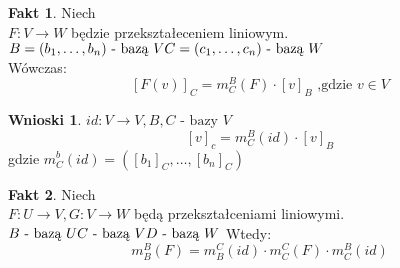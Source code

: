 \documentclass[12pt,a4paper]{article}
\theoremstyle{plain}
\theoremstyle{definition}
\newtheorem{ft}{Fakt}[section]
\theoremstyle{definition}
\theoremstyle{definition}
\theoremstyle{definition}
\theoremstyle{definition}
\theoremstyle{definition}
\theoremstyle{definition}
\theoremstyle{definition}
\theoremstyle{definition}
\newtheorem*{wn}{Wnioski}
\begin{document}
\begin{ft}
    Niech \\ $ F: V \rightarrow W $ będzie przekształeceniem liniowym.\\
    $ B = (b_1, \ldots , b_n) \text{ - bazą } V \\
      C = (c_1, \ldots , c_n) \text{ - bazą } W $ \\
    Wówczas:
    $$ [F(v)]_C = m^B_C(F) \cdot [v]_B \text{ ,gdzie } v \in V$$
\end{ft}

\begin{wn}
    $ id: V \rightarrow V, B, C \text{ - bazy } V$
    $$ [v]_c = m^B_C(id) \cdot [v]_B $$
    gdzie $ m^b_C(id) = ( [b_1]_C, \ldots , [b_n]_C)$
\end{wn}

\begin{ft}
    Niech \\ $ F: U \rightarrow V, G: V \rightarrow W $ będą przekształceniami liniowymi.\\
  $ B \text{ - bazą } U\\
    C \text{ - bazą } V\\
    D \text{ - bazą } W\\ $
    Wtedy: $$ m^B_B(F) = m^C_B(id) \cdot m^C_C(F) \cdot m^B_C(id)$$
      
\end{ft}
\end{document}
